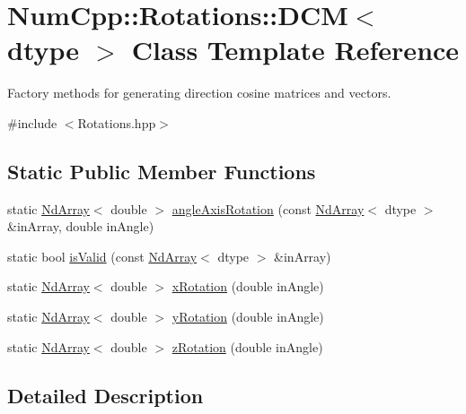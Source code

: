 \hypertarget{class_num_cpp_1_1_rotations_1_1_d_c_m}{}\section{Num\+Cpp\+:\+:Rotations\+:\+:D\+CM$<$ dtype $>$ Class Template Reference}
\label{class_num_cpp_1_1_rotations_1_1_d_c_m}


Factory methods for generating direction cosine matrices and vectors.  




{\ttfamily \#include $<$Rotations.\+hpp$>$}

\subsection*{Static Public Member Functions}
\begin{DoxyCompactItemize}
\item 
static \mbox{\hyperlink{class_num_cpp_1_1_nd_array}{Nd\+Array}}$<$ double $>$ \mbox{\hyperlink{class_num_cpp_1_1_rotations_1_1_d_c_m_a3d75bbc08842f49beeb41be7eb1f7c1b}{angle\+Axis\+Rotation}} (const \mbox{\hyperlink{class_num_cpp_1_1_nd_array}{Nd\+Array}}$<$ dtype $>$ \&in\+Array, double in\+Angle)
\item 
static bool \mbox{\hyperlink{class_num_cpp_1_1_rotations_1_1_d_c_m_a2173648fd6088e1ef98de97f7131cbac}{is\+Valid}} (const \mbox{\hyperlink{class_num_cpp_1_1_nd_array}{Nd\+Array}}$<$ dtype $>$ \&in\+Array)
\item 
static \mbox{\hyperlink{class_num_cpp_1_1_nd_array}{Nd\+Array}}$<$ double $>$ \mbox{\hyperlink{class_num_cpp_1_1_rotations_1_1_d_c_m_aa8a963c18f3dde1fa4fd37f5dd1d976e}{x\+Rotation}} (double in\+Angle)
\item 
static \mbox{\hyperlink{class_num_cpp_1_1_nd_array}{Nd\+Array}}$<$ double $>$ \mbox{\hyperlink{class_num_cpp_1_1_rotations_1_1_d_c_m_a7843801d5e1f9cb57cbf152205a44bb5}{y\+Rotation}} (double in\+Angle)
\item 
static \mbox{\hyperlink{class_num_cpp_1_1_nd_array}{Nd\+Array}}$<$ double $>$ \mbox{\hyperlink{class_num_cpp_1_1_rotations_1_1_d_c_m_aaa05c16ece645e72d8396a73bf2a6e32}{z\+Rotation}} (double in\+Angle)
\end{DoxyCompactItemize}


\subsection{Detailed Description}
